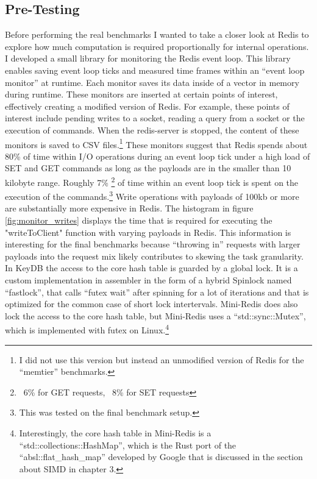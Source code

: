 \subsection{Pre-Testing}
Before performing the real benchmarks I wanted to take a closer look at Redis to explore how much computation is required proportionally for internal operations. I developed a small library for monitoring the Redis event loop. This library enables saving event loop ticks and measured time frames within an “event loop monitor” at runtime. Each monitor saves its data inside of a vector in memory during runtime. These monitors are inserted at certain points of interest, effectively creating a modified version of Redis. For example, these points of interest include pending writes to a socket, reading a query from a socket or the execution of commands. When the redis-server is stopped, the content of these monitors is saved to CSV files.\footnote{I did not use this version but instead an unmodified version of Redis for the “memtier” benchmarks.} \newline
These monitors suggest that Redis spends about 80\% of time within I/O operations during an event loop tick under a high load of SET and GET commands as long as the payloads are in the smaller than 10 kilobyte range. \newline
Roughly 7\% \footnote{~6\% for GET requests, ~8\% for SET requests} of time within an event loop tick is spent on the execution of the commands.\footnote{This was tested on the final benchmark setup.}
Write operations with payloads of 100kb or more are substantially more expensive in Redis. The histogram in figure \ref{fig:monitor_writes} displays the time that is required for executing the "writeToClient" function with varying payloads in Redis. This information is interesting for the final benchmarks because “throwing in” requests with larger payloads into the request mix likely contributes to skewing the task granularity.\newline
In KeyDB the access to the core hash table is guarded by a global lock. It is a custom implementation in assembler in the form of a hybrid Spinlock named “fastlock”, that calls “futex wait” after spinning for a lot of iterations and that is optimized for the common case of short lock intertervals. Mini-Redis does also lock the access to the core hash table, but Mini-Redis uses a “std::sync::Mutex”, which is implemented with futex on Linux.\footnote{Interestingly, the core hash table in Mini-Redis is a “std::collections::HashMap”, which is the Rust port of the “absl::flat\_hash\_map” developed by Google that is discussed in the section about SIMD in chapter 3.} \newline
